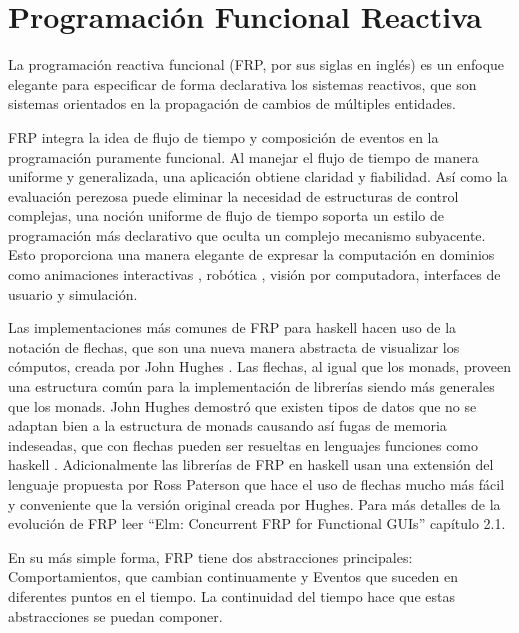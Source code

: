 
\section{Programación Funcional Reactiva}  %

\ifpdf
    \graphicspath{{FRP/Figs/Raster/}{FRP/Figs/PDF/}{FRP/Figs/}}
\else
    \graphicspath{{FRP/Figs/Vector/}{FRP/Figs/}}
\fi

La programación reactiva funcional (FRP, por sus siglas en inglés) es un enfoque elegante para especificar de forma declarativa los sistemas reactivos, que son sistemas orientados en la propagación de cambios de múltiples entidades.

FRP integra la idea de flujo de tiempo y composición de eventos en la programación puramente funcional. Al manejar el flujo de tiempo de manera uniforme y generalizada, una aplicación obtiene claridad y fiabilidad. Así como la evaluación perezosa puede eliminar la necesidad de estructuras de control complejas, una noción uniforme de flujo de tiempo soporta un estilo de programación más declarativo que oculta un complejo mecanismo subyacente. Esto proporciona una manera elegante de expresar la computación en dominios como animaciones interactivas \cite{eh97:fran}, robótica \cite{Pembeci:2002:FRR:571157.571174}, visión por computadora, interfaces de usuario \cite{czaplicki2012elm} y simulación.

Las implementaciones más comunes de FRP para haskell  hacen uso de la notación de flechas, que son una nueva manera abstracta de visualizar los cómputos, creada por John Hughes \cite{hughes2000generalising}. Las flechas, al igual que los monads, proveen una estructura común para la implementación de librerías siendo más generales que los monads. John Hughes demostró que existen tipos de datos que no se adaptan bien a la estructura de monads causando así fugas de memoria indeseadas, que con flechas pueden ser resueltas en lenguajes funciones como haskell \cite{hughes2000generalising}. Adicionalmente las librerías de FRP en haskell usan una extensión del lenguaje propuesta por Ross  Paterson \cite{paterson2001new} que hace el uso de flechas mucho más fácil y conveniente que la versión original creada por Hughes. Para más detalles de la evolución de FRP leer ``Elm: Concurrent FRP for Functional GUIs'' \cite{czaplicki2012elm} capítulo 2.1.

En su más simple forma, FRP tiene dos abstracciones principales: Comportamientos, que cambian continuamente y Eventos que suceden en diferentes puntos en el tiempo. La continuidad del tiempo hace que estas abstracciones se puedan componer.

